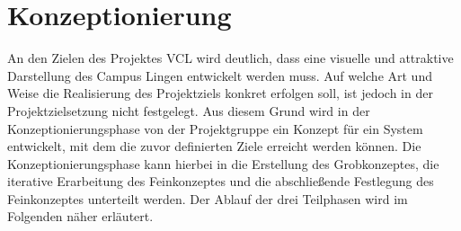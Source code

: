 \section{Konzeptionierung}
\label{sec:Konzeptionierung}

An den Zielen des Projektes \acs{VCL} wird deutlich, dass eine visuelle und
attraktive Darstellung des Campus Lingen entwickelt werden muss. Auf welche Art
und Weise die Realisierung des Projektziels konkret erfolgen soll, ist jedoch in
der Projektzielsetzung nicht festgelegt. Aus diesem Grund wird in der
Konzeptionierungsphase von der Projektgruppe ein Konzept für ein System
entwickelt, mit dem die zuvor definierten Ziele erreicht werden können. Die
Konzeptionierungsphase kann hierbei in die Erstellung des Grobkonzeptes, die
iterative Erarbeitung des Feinkonzeptes und die abschließende Festlegung des
Feinkonzeptes unterteilt werden. Der Ablauf der drei Teilphasen wird im
Folgenden näher erläutert.






